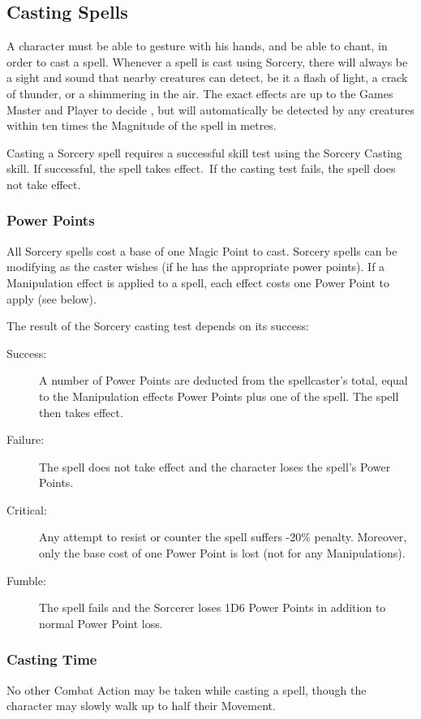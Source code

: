 \subsection{Casting Spells}
A character must be able to gesture with his hands, and be able to chant, in order to cast a spell. Whenever a spell is cast using Sorcery, there will always be a sight and sound that nearby creatures can detect, be it a flash of light, a crack of thunder, or a shimmering in the air. The exact effects are up to the Games Master and Player to decide , but will automatically be detected by any creatures within ten times the Magnitude of the spell in metres. 

Casting a Sorcery spell requires a successful skill test using the Sorcery Casting skill. If successful, the spell takes effect. If the casting test fails, the spell does not take effect. 

\subsubsection{Power Points}
All Sorcery spells cost a base of one Magic Point to cast. Sorcery spells can be modifying as the caster wishes (if he has the appropriate power points). If a Manipulation effect is applied to a spell, each effect costs one Power Point to apply (see below). 

The result of the Sorcery casting test depends on its success:
\begin{description}
	\item[Success:] A number of Power Points are deducted from the spellcaster’s total, equal to the Manipulation effects Power Points plus one of the spell. The spell then takes effect.
	\item[Failure:] The spell does not take effect and the character loses the spell's Power Points.
	\item[Critical:] Any attempt to resist or counter the spell suffers -20\% penalty. Moreover, only the base cost of one Power Point is lost (not for any Manipulations).
	\item[Fumble:] The spell fails and the Sorcerer loses 1D6 Power Points in addition to normal Power Point loss.
\end{description}


\subsubsection{Casting Time}
No other Combat Action may be taken while casting a spell, though the character may slowly walk up to half their Movement. 

